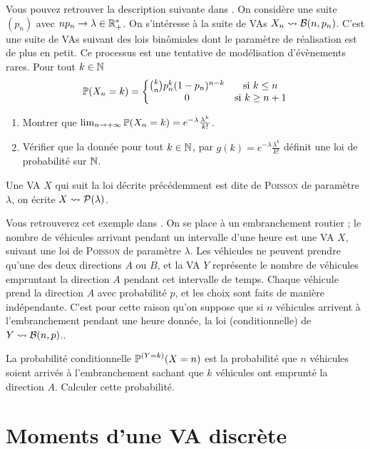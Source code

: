 \documentclass[11pt, a4paper]{article}
\begin{document}
Vous pouvez retrouver la description suivante dans
\cite{aleaprobasIX}. On considère une suite $(p_n)$ avec
$np_n \to \lambda \in \mathbb{R}_+^*$. On s'intéresse à la suite de VAs
$X_n \leadsto \mathcal{B}(n, p_n)$. C'est une suite de VAs suivant des lois
binômiales dont le paramètre de réalisation est de plus en petit. Ce
processus est une tentative de modélisation d'évènements rares. Pour
tout $ k \in \mathbb{N}$
\[
  \operatorname{\mathbb{P}}(X_n = k) = \left\{
    \begin{matrix}
      \binom{k}{n}p_n^k(1-p_n)^{n-k} & \textrm{si $k \leq n$} \\
      0 & \textrm{si $k \geq n+1$}
    \end{matrix}\right.
\]
\begin{question}
  \begin{enumerate}
  \item Montrer que
    $\lim_{n \to +\infty} \operatorname{\mathbb{P}}(X_n = k) =
    e^{-\lambda}\frac{\lambda^k}{k!}$.
  \item Vérifier que la donnée pour tout $k \in \mathbb{N}$, par
    $g(k) = e^{-\lambda}\frac{\lambda^k}{k!}$ définit une loi de
    probabilité sur $\mathbb{N}$.
  \end{enumerate}
\end{question}
Une VA $X$ qui suit la loi décrite précédemment est dite de
\textsc{Poisson} de paramètre $\lambda$, on écrite
$X \leadsto \mathcal{P}(\lambda)$.
\begin{question}
  Vous retrouverez cet exemple dans \cite[page
  94]{ouvrard1998probabilites}. On se place à un embranchement routier
  ; le nombre de véhicules arrivant pendant un intervalle d'une heure
  est une VA $X$, suivant une loi de \textsc{Poisson} de paramètre
  $\lambda$. Les véhicules ne peuvent prendre qu'une des deux
  directions $A$ ou $B$, et la VA $Y$ représente le nombre de
  véhicules empruntant la direction $A$ pendant cet intervalle de
  temps. Chaque véhicule prend la direction $A$ avec probabilité $p$,
  et les choix sont faits de manière indépendante. C'est pour cette
  raison qu'on suppose que si $n$ véhicules arrivent à l'embranchement
  pendant une heure donnée, la loi (conditionnelle) de
  $Y \leadsto \mathcal{B}(n, p)$..

  La probabilité conditionnelle $\operatorname{\mathbb{P}}^{(Y = k)}(X = n)$ est la
  probabilité que $n$ véhicules soient arrivés à l'embranchement
  sachant que $k$ véhicules ont emprunté la direction $A$. Calculer
  cette probabilité.
\end{question}

\section{Moments d'une VA discrète}
\label{sec:momentsVAdiscrète}
\end{document}
